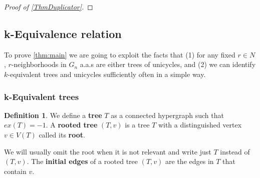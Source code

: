 \documentclass[12pt,notitlepage,a4paper]{article}
\theoremstyle{definition}
\newtheorem{definition}{Definition}[section]
\begin{document}
\begin{proof}[Proof of \cref{ThmDuplicator}]
%		
%	
\end{proof}



\subsection{k-Equivalence relation}

To prove \cref{thm:main} we are going to exploit the facts that
(1) for any fixed $r\in N$, $r$-neighborhoods in $G_n$ a.a.s 
are either trees of unicycles, and
(2) we can identify $k$-equivalent trees
and unicycles sufficiently often in a simple way.


\subsubsection{k-Equivalent trees}

\begin{definition}
	We define a \textbf{tree} $T$ as a connected hypergraph such that
	$ex(T)=-1$. A \textbf{rooted tree} $(T,v)$ is a tree $T$ with a 
	distinguished vertex $v\in V(T)$ called its \textbf{root}.
\end{definition}
We will usually omit the root when it is not relevant and 
write just $T$ instead of $(T,v)$. The
\textbf{initial edges} of a rooted tree $(T,v)$ are 
the edges in $T$ that contain $v$. \par
\end{document}
